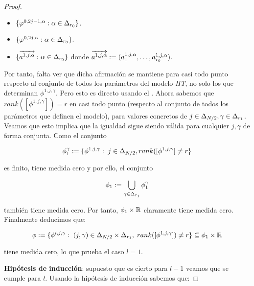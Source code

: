 \begin{proof}
    \begin{itemize}
        \item $\{ \varphi^{0, 2j - 1, \alpha}: \alpha \in \Delta_{r_0} \}$.
        \item $\{ \varphi^{0, 2j, \alpha}: \alpha \in \Delta_{r_0} \}$.
        \item $\{ \overrightarrow{a^{1, j, \alpha}} : \alpha \in \Delta_{r_0} \}$ donde $\overrightarrow{a^{1, j, \alpha}} := (a^{1, j, \alpha}_1, \ldots,  a^{1, j, \alpha}_{r_0})$.
    \end{itemize}

    Por tanto, falta ver que dicha afirmación se mantiene para casi todo punto respecto al conjunto de todos los parámetros del modelo \textit{HT}, no solo los que determinan $\phi^{1, j, \gamma}$. Pero esto es directo usando el . Ahora sabemos que $rank([\phi^{1, j, \gamma}]) = r$ en casi todo punto (respecto al conjunto de todos los parámetros que definen el modelo), para valores concretos de $j \in \Delta_{N/2}, \gamma \in \Delta_{r_1}$. Veamos que esto implica que la igualdad sigue siendo válida para cualquier $j, \gamma$ de forma conjunta. Como el conjunto

    \begin{equation}
        \phi_1^\gamma := \{ \phi^{1, j, \gamma}: \; j \in \Delta_{N/2}, rank([\phi^{1, j, \gamma}] \neq r \}
    \end{equation}

    es finito, tiene medida cero y por ello, el conjunto

    \begin{equation}
        \phi_1 := \bigcup_{\gamma \in \Delta_{r_1}} \phi_1^\gamma
    \end{equation}

    también tiene medida cero. Por tanto, $\phi_1 \times \mathbb{R}$ claramente tiene medida cero. Finalmente deducimos que:

    \begin{equation}
        \phi := \{ \phi^{i, j, \gamma}: \; (j, \gamma) \in \Delta_{N/2} \times \Delta_{r_1}, \; rank([\phi^{1, j, \gamma}]) \neq r \} \subseteq \phi_1 \times \mathbb{R}
    \end{equation}

    tiene medida cero, lo que prueba el caso $l = 1$.

    \textbf{Hipótesis de inducción}: supuesto que es cierto para $l - 1$ veamos que se cumple para $l$. Usando la hipótesis de inducción sabemos que:


\end{proof}
